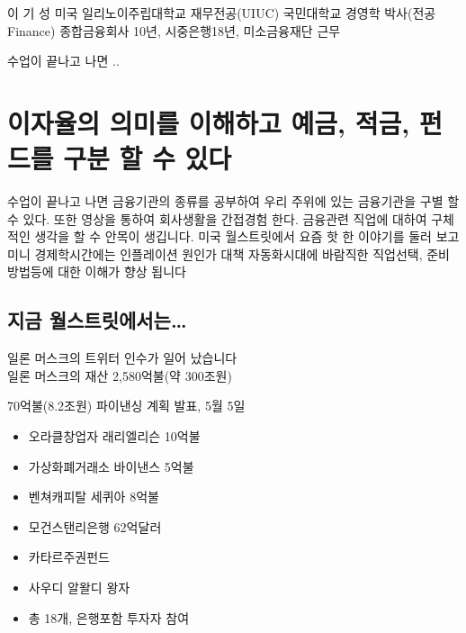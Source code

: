 \documentclass[
]{book}
\providecommand{\tightlist}{%
  \setlength{\itemsep}{0pt}\setlength{\parskip}{0pt}}
\begin{document}
이 기 성
미국 일리노이주립대학교 재무전공(UIUC)
국민대학교 경영학 박사(전공 Finance)
종합금융회사 10년, 시중은행18년, 미소금융재단 근무

수업이 끝나고 나면 ..

\hypertarget{uxc774uxc790uxc728uxc758-uxc758uxbbf8uxb97c-uxc774uxd574uxd558uxace0-uxc608uxae08-uxc801uxae08-uxd380uxb4dcuxb97c-uxad6cuxbd84-uxd560-uxc218-uxc788uxb2e4}{%
\chapter{이자율의 의미를 이해하고 예금, 적금, 펀드를 구분 할 수 있다}\label{uxc774uxc790uxc728uxc758-uxc758uxbbf8uxb97c-uxc774uxd574uxd558uxace0-uxc608uxae08-uxc801uxae08-uxd380uxb4dcuxb97c-uxad6cuxbd84-uxd560-uxc218-uxc788uxb2e4}}

수업이 끝나고 나면 금융기관의 종류를 공부하여 우리 주위에 있는 금융기관을 구별 할 수 있다. 또한 영상을 통하여 회사생활을 간접경험 한다. 금융관련 직업에 대하여 구체적인 생각을 할 수 안목이 생깁니다. 미국 월스트릿에서 요즘 핫 한 이야기를 둘러 보고 미니 경제학시간에는 인플레이션 원인가 대책 자동화시대에 바람직한 직업선택, 준비방법등에 대한 이해가 향상 됩니다

\hypertarget{uxc9c0uxae08-uxc6d4uxc2a4uxd2b8uxb9bfuxc5d0uxc11cuxb294}{%
\section{지금 월스트릿에서는\ldots{}}\label{uxc9c0uxae08-uxc6d4uxc2a4uxd2b8uxb9bfuxc5d0uxc11cuxb294}}

일론 머스크의 트위터 인수가 일어 났습니다\\
일론 머스크의 재산 2,580억불(약 300조원)

70억불(8.2조원) 파이낸싱 계획 발표, 5월 5일

\begin{itemize}
\tightlist
\item
  오라클창업자 래리엘리슨 10억불\\
\item
  가상화폐거래소 바이낸스 5억불\\
\item
  벤쳐캐피탈 세퀴아 8억불\\
\item
  모건스탠리은행 62억달러\\
\item
  카타르주권펀드\\
\item
  사우디 알왈디 왕자\\
\item
  총 18개, 은행포함 투자자 참여
\end{itemize}
\end{document}
